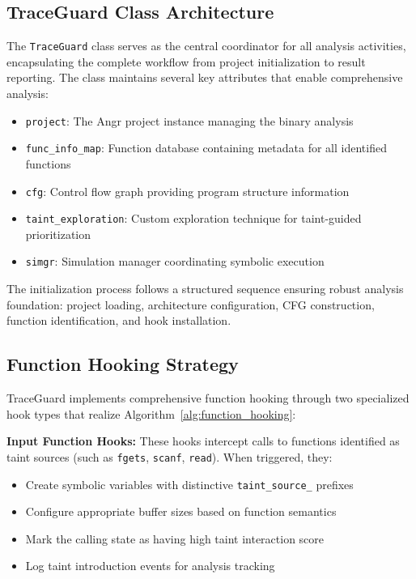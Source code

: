 \subsection{TraceGuard Class Architecture}

The \texttt{TraceGuard} class serves as the central coordinator for all analysis activities, encapsulating the complete workflow from project initialization to result reporting. The class maintains several key attributes that enable comprehensive analysis:

\begin{itemize}
    \item \texttt{project}: The Angr project instance managing the binary analysis
    \item \texttt{func\_info\_map}: Function database containing metadata for all identified functions
    \item \texttt{cfg}: Control flow graph providing program structure information
    \item \texttt{taint\_exploration}: Custom exploration technique for taint-guided prioritization
    \item \texttt{simgr}: Simulation manager coordinating symbolic execution
\end{itemize}

The initialization process follows a structured sequence ensuring robust analysis foundation: project loading, architecture configuration, CFG construction, function identification, and hook installation.

\subsection{Function Hooking Strategy}

TraceGuard implements comprehensive function hooking through two specialized hook types that realize Algorithm~\ref{alg:function_hooking}:

\textbf{Input Function Hooks:} These hooks intercept calls to functions identified as taint sources (such as \texttt{fgets}, \texttt{scanf}, \texttt{read}). When triggered, they:
\begin{itemize}
    \item Create symbolic variables with distinctive \texttt{taint\_source\_} prefixes
    \item Configure appropriate buffer sizes based on function semantics
    \item Mark the calling state as having high taint interaction score
    \item Log taint introduction events for analysis tracking
\end{itemize}

